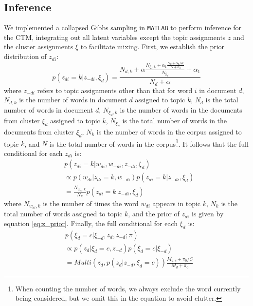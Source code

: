 \documentclass{article}
\begin{document}
\subsection{Inference}
We implemented a collapsed Gibbs sampling in \texttt{MATLAB} to perform inference for the CTM, integrating out all latent variables except the topic assignments $z$ and the cluster assignments $\xi$ to facilitate mixing. First, we establish the prior distribution of $z_{di}$:
\begin{equation} \label{eq:z_prior}
p(z_{di} = k | z_{-di}, \xi_d) = \frac{N_{d,k} + \alpha\frac{N_{\xi_d,k} + \alpha_1\frac{N_k + \alpha_0/K}{N + \alpha_0}}{N_{\xi_d}} + \alpha_1}{N_d + \alpha}
\end{equation}
where $z_{-di}$ refers to topic assignments other than that for word $i$ in document $d$, $N_{d,k}$ is the number of words in document $d$ assigned to topic $k$, $N_d$ is the total number of words in document $d$, $N_{\xi_d,k}$ is the number of words in the documents from cluster $\xi_d$ assigned to topic $k$, $N_{\xi_d}$ is the total number of words in the documents from cluster $\xi_d$, $N_k$ is the number of words in the corpus assigned to topic $k$, and $N$ is the total number of words in the corpus\footnote{When counting the number of words, we always exclude the word currently being considered, but we omit this in the equation to avoid clutter.}. It follows that the full conditional for each $z_{di}$ is:
\begin{equation}
\left.\begin{aligned}
&p(z_{di} = k | w_{di}, w_{-di}, z_{-di}, \xi_d)\\
&\propto p(w_{di} | z_{di} = k, w_{-di})p(z_{di} = k | z_{-di}, \xi_d)\\
&= \frac{N_{w_{di},k}}{N_k}p(z_{di} = k | z_{-di}, \xi_d)
\end{aligned}\right.
\end{equation}
where $N_{w_{di},k}$ is the number of times the word $w_{di}$ appears in topic $k$, $N_k$ is the total number of words assigned to topic $k$, and the prior of $z_{di}$ is given by equation \ref{eq:z_prior}. Finally, the full conditional for each $\xi_d$ is:
\begin{equation}
\left.\begin{aligned}
&p(\xi_d = c | \xi_{-d},z_d, z_{-d}; \pi)\\
&\propto p(z_d | \xi_d = c, z_{-d})p(\xi_d = c | \xi_{-d})\\
&= Multi(z_d, p(z_{d}| z_{-d}, \xi_d = c)) \frac{M_{d,c} + \pi_0/C}{M_d + \pi_0}
\end{aligned}\right.
\end{equation}
\end{document}
